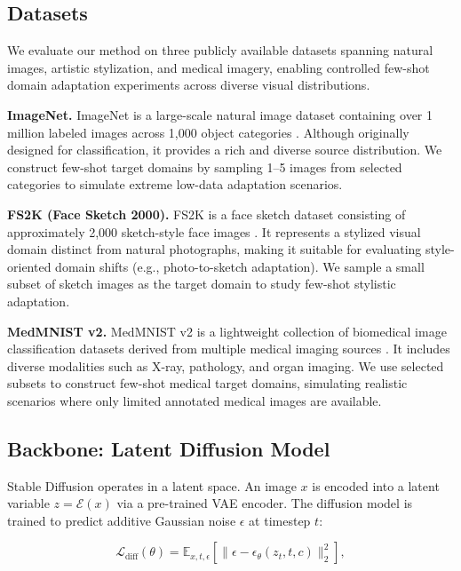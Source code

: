 \documentclass{article}
\begin{document}
\subsection{Datasets}

We evaluate our method on three publicly available datasets spanning natural images, artistic stylization, and medical imagery, enabling controlled few-shot domain adaptation experiments across diverse visual distributions.

\textbf{ImageNet.}
ImageNet is a large-scale natural image dataset containing over 1 million labeled images across 1,000 object categories \cite{deng2009imagenet}. 
Although originally designed for classification, it provides a rich and diverse source distribution. 
We construct few-shot target domains by sampling 1--5 images from selected categories to simulate extreme low-data adaptation scenarios.

\textbf{FS2K (Face Sketch 2000).}
FS2K is a face sketch dataset consisting of approximately 2,000 sketch-style face images \cite{fan2022fs2k}. 
It represents a stylized visual domain distinct from natural photographs, making it suitable for evaluating style-oriented domain shifts (e.g., photo-to-sketch adaptation). 
We sample a small subset of sketch images as the target domain to study few-shot stylistic adaptation.

\textbf{MedMNIST v2.}
MedMNIST v2 is a lightweight collection of biomedical image classification datasets derived from multiple medical imaging sources \cite{yang2023medmnistv2}. 
It includes diverse modalities such as X-ray, pathology, and organ imaging. 
We use selected subsets to construct few-shot medical target domains, simulating realistic scenarios where only limited annotated medical images are available.

\subsection{Backbone: Latent Diffusion Model}

Stable Diffusion operates in a latent space. 
An image $x$ is encoded into a latent variable $z = \mathcal{E}(x)$ via a pre-trained VAE encoder. 
The diffusion model is trained to predict additive Gaussian noise $\epsilon$ at timestep $t$:

\begin{equation}
\mathcal{L}_{\text{diff}}(\theta) 
= \mathbb{E}_{x,t,\epsilon}
\left[
\|\epsilon - \epsilon_\theta(z_t, t, c)\|_2^2
\right],
\end{equation}
\end{document}
